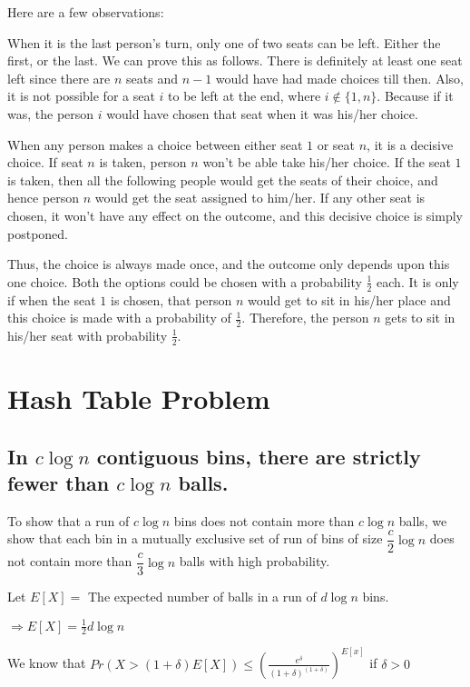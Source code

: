 \documentclass{article}
\begin{document}
Here are a few observations: 

When it is the last person's turn, only one of two seats can be left. 
Either the first, or the last. We can prove this as follows. There is definitely 
at least one seat left since there are $n$ seats and $n-1$ would have had made 
choices till then. Also, it is not possible for a seat $i$ to be
left at the end, where $i \notin  \{ 1, n \}$. Because if it was, the person $i$ would
have chosen that seat when it was his/her choice. 

When any person makes a choice between either seat $1$ or seat $n$, it is a decisive choice.
If seat $n$ is taken, person $n$ won't be able take his/her choice. If the seat
$1$ is taken, then all the following people would get the seats of their choice, and
hence person $n$ would get the seat assigned to him/her. If any other seat is 
chosen, it won't have any effect on the outcome, and this decisive choice
is simply postponed. 

Thus, the choice is always made once, and the outcome only depends upon this one
choice. Both the options could be chosen with a probability $\frac{1}{2}$ each. It is
only if when the seat $1$ is chosen, that person $n$ would get to sit in his/her place
and this choice is made with a probability of $\frac{1}{2}$. Therefore, the person
$n$ gets to sit in his/her seat with probability $\frac{1}{2}$. 


\clearpage

\section{Hash Table Problem}
\subsection{In $c\log{n}$ contiguous bins, there are strictly
fewer than $c\log{n}$ balls.}

To show that a run of $c\log{n}$ bins does not contain more than
$c\log{n}$ balls, we show that each bin in a mutually exclusive set of run of bins
of size $\dfrac{c}{2}\log{n}$ does not contain more than
$\dfrac{c}{3}\log{n}$ balls with high probability.

Let $E[X] =$ The expected number of balls in a run of $d\log{n}$ bins.

$\Rightarrow E[X] = \frac{1}{2}d\log{n}$

We know that $Pr(X > (1+\delta)E[X]) \le \left( \frac{e^\delta}{(1+\delta)^{(1+\delta)}} \right)^{E[x]}$ if $\delta > 0$
\end{document}
